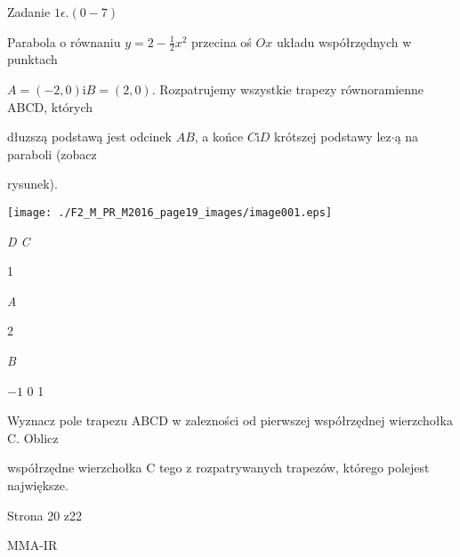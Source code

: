 \documentclass[a4paper,12pt]{article}
\begin{document}
Zadanie $1\epsilon. (0-7)$

Parabola o równaniu $y=2-\displaystyle \frac{1}{2}x^{2}$ przecina oś $Ox$ układu współrzędnych w punktach

$A=(-2,0) \mathrm{i} B=(2,0)$. Rozpatrujemy wszystkie trapezy równoramienne ABCD, których

dłuzszą podstawą jest odcinek $AB$, a końce $C\mathrm{i}D$ krótszej podstawy lez$\cdot$ą na paraboli (zobacz

rysunek).
\begin{center}
\texttt{[image: ./F2\_M\_PR\_M2016\_page19\_images/image001.eps]}
\end{center}
{\it D C}

1

{\it A}

2

{\it B}

$-1$  0 1

Wyznacz pole trapezu ABCD w zalezności od pierwszej współrzędnej wierzchołka C. Oblicz

współrzędne wierzchołka C tego z rozpatrywanych trapezów, którego polejest największe.

Strona 20 z22

MMA-IR
\end{document}
